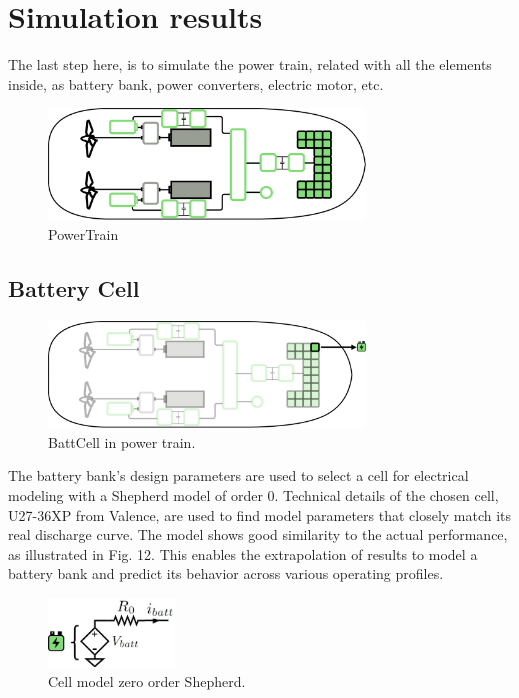 \chapter{Simulation results}

The last step here, is to simulate the power train, related with all the elements inside, as battery bank, power converters, electric motor, etc.

\begin{figure}[h]
    \centering
    \includegraphics[width=0.75\textwidth]{images/chapter05/PowerTrain.jpg}
    \caption{PowerTrain}
    \label{PowerTrain}
\end{figure}

\section{Battery Cell}

\begin{figure}[h]
    \centering
    \includegraphics[width=0.75\textwidth]{images/chapter05/BattCell_scheme.jpg}
    \caption{BattCell in power train.}
    \label{BattCell}
\end{figure}

The battery bank’s design parameters are used to select a cell for electrical modeling with a Shepherd model of order 0. Technical details of the chosen cell, U27-36XP from Valence, are used to find model parameters that closely match its real discharge curve. The model shows good similarity to the actual performance, as illustrated in Fig. 12. This enables the extrapolation of results to model a battery bank and predict its behavior across various operating profiles.

\begin{figure}[h]
    \centering
    \includegraphics[width=0.3\textwidth]{images/chapter05/Cell_model.jpg}
    \caption{Cell model zero order Shepherd.}
    \label{fig:Zo_Shepherd}
\end{figure}


